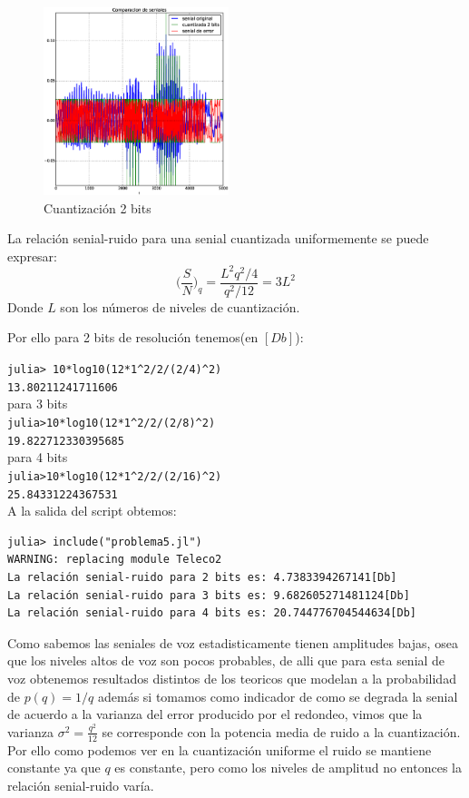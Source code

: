 \documentclass[10pt]{article}
\begin{document}
\begin{figure}[H]
   \centering
   \includegraphics[width=0.48\textwidth]{./Images/senialesv_voz_2_bits.eps}
   \caption{Cuantización 2 bits}\label{fig:qv:2}     
\end{figure}
La relación senial-ruido para una senial cuantizada uniformemente se puede expresar:
\begin{equation}
\Bigg( \frac{S}{N} \Bigg)_{q} = \frac{L^{2}q^{2}/4}{q^{2}/12} = 3L^{2}
\end{equation}
Donde $L$ son los números de niveles de cuantización.

Por ello para 2 bits de resolución tenemos(en $[Db]$):

\verb|julia> 10*log10(12*1^2/2/(2/4)^2)|\\
\verb|13.80211241711606|\\
para 3 bits\\
\verb|julia>10*log10(12*1^2/2/(2/8)^2)|\\
\verb|19.822712330395685|\\
para 4 bits\\
\verb|julia>10*log10(12*1^2/2/(2/16)^2)|\\
\verb|25.84331224367531|\\

A la salida del script obtemos:
\begin{verbatim}
julia> include("problema5.jl")
WARNING: replacing module Teleco2
La relación senial-ruido para 2 bits es: 4.7383394267141[Db]
La relación senial-ruido para 3 bits es: 9.682605271481124[Db]
La relación senial-ruido para 4 bits es: 20.744776704544634[Db]
\end{verbatim}

Como sabemos las seniales de voz estadisticamente tienen amplitudes bajas, osea que
los niveles altos de voz son pocos probables, de alli que para esta senial de 
voz obtenemos resultados distintos de los teoricos que modelan a la probabilidad 
de $p(q)=1/q$ además si tomamos como indicador de como se
degrada la senial de acuerdo a la varianza del error producido por el redondeo, vimos que
la varianza $\sigma^{2}=\frac{q^{2}}{12}$ se corresponde con la potencia media de ruido 
a la cuantización. Por ello como podemos ver en la cuantización uniforme el ruido se mantiene constante
ya que $q$ es constante, pero como los niveles de amplitud no entonces la relación senial-ruido varía. 
\end{document}
